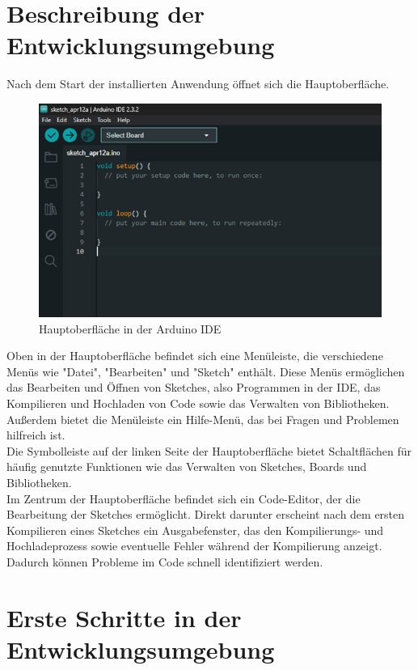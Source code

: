 \section{Beschreibung der Entwicklungsumgebung}
Nach dem Start der installierten Anwendung öffnet sich die Hauptoberfläche.
\begin{figure}[htb]
	\begin{center}
		\includegraphics[width=\textwidth]{General/HauptoberflaecheIDE.png}
		\caption{Hauptoberfläche in der Arduino IDE} \label{Hauptoberfläche in der Arduino IDE}
	\end{center}
\end{figure}
Oben in der Hauptoberfläche befindet sich eine Menüleiste, die verschiedene Menüs wie "Datei", "Bearbeiten" und "Sketch" enthält. Diese Menüs ermöglichen das Bearbeiten und Öffnen von Sketches, also Programmen in der IDE, das Kompilieren und Hochladen von Code sowie das Verwalten von Bibliotheken. Außerdem bietet die Menüleiste ein Hilfe-Menü, das bei Fragen und Problemen hilfreich ist. \\
Die Symbolleiste auf der linken Seite der Hauptoberfläche bietet Schaltflächen für häufig genutzte Funktionen wie das Verwalten von Sketches, Boards und Bibliotheken.\\
Im Zentrum der Hauptoberfläche befindet sich ein Code-Editor, der die Bearbeitung der Sketches ermöglicht. Direkt darunter erscheint nach dem ersten Kompilieren eines Sketches ein Ausgabefenster, das den Kompilierungs- und Hochladeprozess sowie eventuelle Fehler während der Kompilierung anzeigt. Dadurch können Probleme im Code schnell identifiziert werden.\\

\section{Erste Schritte in der Entwicklungsumgebung}
